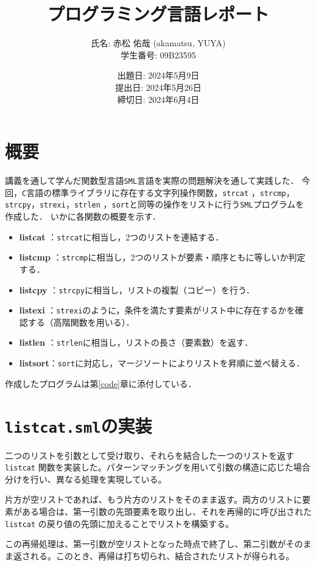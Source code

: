 \documentclass[autodetect-engine,dvi=dvipdfmx,ja=standard,
               a4j,11pt]{bxjsarticle}
\title{プログラミング言語レポート}
\author{氏名: 赤松 佑哉 (akamatsu, YUYA) \\
        学生番号: 09B23595}
\date{出題日: 2024年5月9日 \\
      提出日: 2024年5月26日 \\
      締切日: 2024年6月4日 \\}  %
\begin{document}
\maketitle
\section{概要}
講義を通して学んだ関数型言語\verb|SML|言語を実際の問題解決を通して実践した．
今回，\verb|C|言語の標準ライブラリに存在する文字列操作関数，\verb|strcat|
，\verb|strcmp|，\verb|strcpy|，\verb|strexi|，\verb|strlen|
，\verb|sort|と同等の操作をリストに行う\verb|SML|プログラムを作成した．
いかに各関数の概要を示す．
\begin{itemize}
    \item \textbf{listcat} ：\verb|strcat|に相当し，2つのリストを連結する．
    \item \textbf{listcmp} ：\verb|strcmp|に相当し，2つのリストが要素・順序ともに等しいか判定する．
    \item \textbf{listcpy} ：\verb|strcpy|に相当し，リストの複製（コピー）を行う．
    \item \textbf{listexi} ：\verb|strexi|のように，条件を満たす要素がリスト中に存在するかを確認する（高階関数を用いる）．
    \item \textbf{listlen} ：\verb|strlen|に相当し，リストの長さ（要素数）を返す．
    \item \textbf{listsort}：\verb|sort|に対応し，マージソートによりリストを昇順に並べ替える．
\end{itemize}
作成したプログラムは第\ref{code}章に添付している．
\section{\texttt{listcat.sml}の実装}

二つのリストを引数として受け取り、それらを結合した一つのリストを返す \verb|listcat| 関数を実装した。パターンマッチングを用いて引数の構造に応じた場合分けを行い、異なる処理を実現している。

片方が空リストであれば、もう片方のリストをそのまま返す。両方のリストに要素がある場合は、第一引数の先頭要素を取り出し、それを再帰的に呼び出された \verb|listcat| の戻り値の先頭に加えることでリストを構築する。

この再帰処理は、第一引数が空リストとなった時点で終了し、第二引数がそのまま返される。このとき、再帰は打ち切られ、結合されたリストが得られる。
\end{document}

